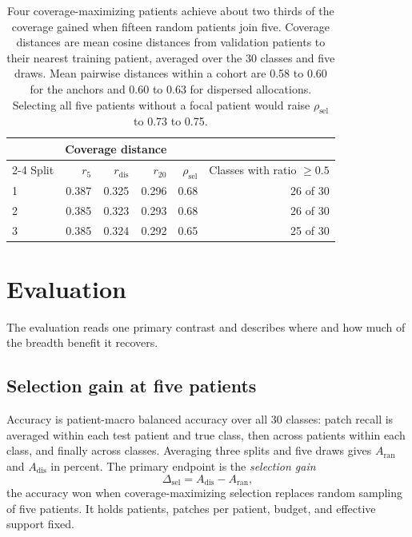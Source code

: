 \documentclass[11pt]{article}
\begin{document}
\begin{table}[htbp]
\centering
\renewcommand{\arraystretch}{1.15}
\begin{tabular}{@{}lrrrrr@{}}
\toprule
 & \multicolumn{3}{c}{Coverage distance} & & \\
\cmidrule(lr){2-4}
Split & $r_{5}$ & $r_{\mathrm{dis}}$ & $r_{20}$ & $\rho_{\mathrm{sel}}$ & Classes with ratio $\ge 0.5$ \\
\midrule
1 & 0.387 & 0.325 & 0.296 & 0.68 & 26 of 30 \\
2 & 0.385 & 0.323 & 0.293 & 0.68 & 26 of 30 \\
3 & 0.385 & 0.324 & 0.292 & 0.65 & 25 of 30 \\
\bottomrule
\end{tabular}
\caption{Four coverage-maximizing patients achieve about two thirds of the coverage gained when fifteen random patients join five. Coverage distances are mean cosine distances from validation patients to their nearest training patient, averaged over the 30 classes and five draws. Mean pairwise distances within a cohort are 0.58 to 0.60 for the anchors and 0.60 to 0.63 for dispersed allocations. Selecting all five patients without a focal patient would raise $\rho_{\mathrm{sel}}$ to 0.73 to 0.75.}
\label{tab:check}
\end{table}

\section{Evaluation}
\label{sec:evaluation}
The evaluation reads one primary contrast and describes where and how much of the breadth benefit it recovers.

\subsection{Selection gain at five patients}
\label{sec:contrast}
Accuracy is patient-macro balanced accuracy over all 30 classes: patch recall is averaged within each test patient and true class, then across patients within each class, and finally across classes. Averaging three splits and five draws gives $A_{\mathrm{ran}}$ and $A_{\mathrm{dis}}$ in percent. The primary endpoint is the \emph{selection gain}
\begin{equation}
 \Delta_{\mathrm{sel}}=A_{\mathrm{dis}}-A_{\mathrm{ran}},
 \label{eq:gain}
\end{equation}
\noindent the accuracy won when coverage-maximizing selection replaces random sampling of five patients. It holds patients, patches per patient, budget, and effective support fixed.
\end{document}
